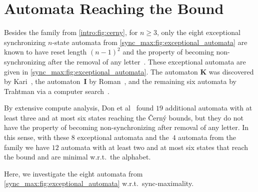 \section{Automata Reaching the \Cerny Bound}
\label{sync_max:sec:cerny_bound}

Besides the \Cerny family from \cref{intro:fig:cerny},
for $n \ge 3$,
only the eight exceptional synchronizing $n$-state automata from \cref{sync_max:fig:exceptional_automata}
are known to have reset length $(n-1)^2$
and the property of becoming non-synchronizing after the removal of any letter~\cite{DonZB21,DBLP:conf/lata/Volkov08}.
These exceptional automata are given in \cref{sync_max:fig:exceptional_automata}.
The automaton $\mathbf{K}$ was
discovered by Kari~\cite{JKari01}, the automaton~$\mathbf{I}$ by Roman~\cite{DBLP:journals/jalc/Roman08},
and the remaining six automata by Trahtman via a computer search~\cite{DBLP:conf/mfcs/Trahtman06}.

By extensive compute analysis, Don et al~\cite{DonZB21} 
found $19$ additional automata with at least three and at most six states reaching the \v{C}ern\'y bounds,
but they do not have the property of becoming
non-synchronizing after removal of any letter. In this sense, with these $8$ exceptional automata
and the~$4$ automata from the \Cerny family we have $12$ automata
with at least two and at most six states that reach the \Cerny bound
and are minimal w.r.t.~the alphabet.

Here, we investigate the eight automata from \cref{sync_max:fig:exceptional_automata} w.r.t.~sync-maximality.

